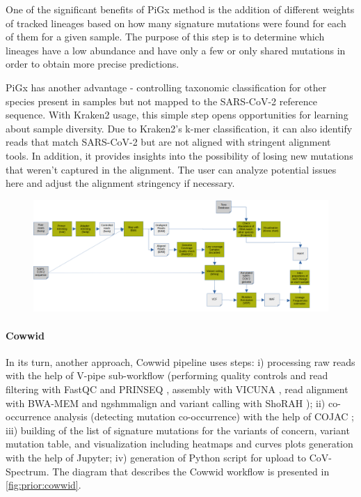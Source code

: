         One of the significant benefits of PiGx method is the addition of different weights of tracked lineages based on how many signature mutations were found for each of them for a given sample. The purpose of this step is to determine which lineages have a low abundance and have only a few or only shared mutations in order to obtain more precise predictions. 

        PiGx has another advantage - controlling taxonomic classification for other species present in samples but not mapped to the SARS-CoV-2 reference sequence. With Kraken2 usage, this simple step opens opportunities for learning about sample diversity. Due to Kraken2's k-mer classification, it can also identify reads that match SARS-CoV-2 but are not aligned with stringent alignment tools. In addition, it provides insights into the possibility of losing new mutations that weren't captured in the alignment. The user can analyze potential issues here and adjust the alignment stringency if necessary.
        \begin{landscape}
        \centering\vspace*{\fill}
        \begin{figure}[H]
        	\centering
            \includegraphics[width=1.5\textwidth]{figures/prior/pigx.png}
            \label{fig:prior:pigx}
        \end{figure}
        \vfill
        \end{landscape}

        \paragraph{Cowwid}
        In its turn, another approach, Cowwid \cite{jahn2021} pipeline uses steps: i) processing raw reads with the help of V-pipe \cite{posada2021} sub-workflow (performing quality controls and read filtering with FastQC and PRINSEQ \cite{babraham,prinseq}, assembly with VICUNA \cite{vicuna2012}, read alignment with BWA-MEM and ngshmmalign \cite{li2013,ngshmmalign2021} and variant calling with ShoRAH \cite{shorah}); ii) co-occurrence analysis (detecting mutation co-occurrence) with the help of COJAC \cite{jahn2022,cojac2022}; iii) building of the list of signature mutations for the variants of concern, variant mutation table, and visualization including heatmaps and curves plots generation with the help of Jupyter; iv) generation of Python script for upload to CoV-Spectrum. The diagram that describes the Cowwid workflow is presented in \cref{fig:prior:cowwid}.
        
